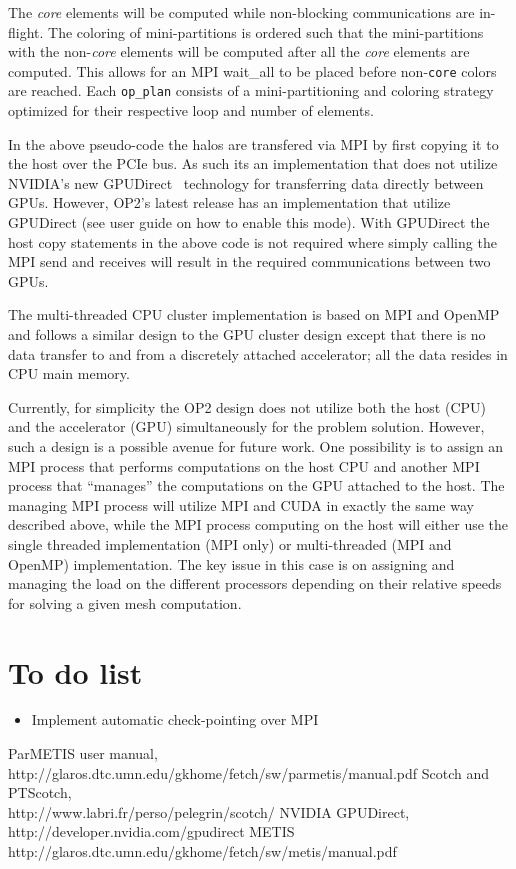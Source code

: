 \documentclass[11pt]{article}
\begin{document}
\noindent The \textit{core} elements will be computed while non-blocking communications are in-flight. The coloring of
mini-partitions is ordered such that the mini-partitions with the non-\textit{core} elements will be computed after all
the \textit{core} elements are computed. This allows for an MPI wait\_all to be placed before non-\texttt{core} colors
are reached. Each \texttt{op\_plan} consists of a mini-partitioning and coloring strategy optimized for their respective
loop and number of elements.

In the above pseudo-code the halos are transfered via MPI by first copying it to the host over the PCIe bus. As such
its an implementation that does not utilize NVIDIA's new GPUDirect~\cite{gpudirect} technology for transferring data
directly between GPUs. However, OP2's latest release has an implementation that utilize GPUDirect (see user guide on
how to enable this mode). With GPUDirect the host copy statements in the above code is not required where simply
calling the MPI send and receives will result in the required communications between two GPUs.

The multi-threaded CPU cluster implementation is based on MPI and OpenMP and follows a similar design to the
GPU cluster design except that there is no data transfer to and from a discretely attached accelerator; all the data
resides in CPU main memory.

Currently, for simplicity the OP2 design does not utilize both the host (CPU) and the accelerator (GPU) simultaneously
for the problem solution. However, such a design is a possible avenue for future work. One possibility is to assign an
MPI process that performs computations on the host CPU and another MPI process that ``manages'' the computations on the
GPU attached to the host. The managing MPI process will utilize MPI and CUDA in exactly the same way described above,
while the MPI process computing on the host will either use the single threaded implementation (MPI only) or
multi-threaded (MPI and OpenMP) implementation. The key issue in this case is on assigning and managing the load on the
different processors depending on their relative speeds for solving a given mesh computation.

\section{To do list}
\begin{itemize}
\item Implement automatic check-pointing over MPI
\end{itemize}


\begin{thebibliography}{4}
 ParMETIS user manual,\\http://glaros.dtc.umn.edu/gkhome/fetch/sw/parmetis/manual.pdf
 Scotch and PTScotch,\\http://www.labri.fr/perso/pelegrin/scotch/
 NVIDIA GPUDirect, \\http://developer.nvidia.com/gpudirect
 METIS \\http://glaros.dtc.umn.edu/gkhome/fetch/sw/metis/manual.pdf
 \end{thebibliography}
\end{document}
